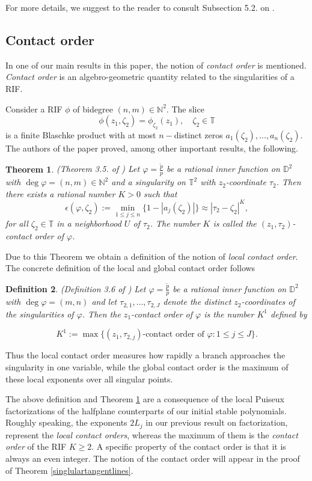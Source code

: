 \documentclass[12pt]{amsart}
\newtheorem{theorem}{Theorem}[section]
\newtheorem{definition}[theorem]{Definition}
\numberwithin{equation}{section}
\begin{document}
For more details, we suggest to the reader to consult Subsection 5.2. on \cite{Clark}.
\subsection{Contact order} In one of our main results in this paper, the notion of \textit{contact order} is mentioned. \textit{Contact order} is an algebro-geometric quantity related to the singularities of a RIF.

Consider a RIF $\phi$ of bidegree $(n,m)\in \mathbb{N}^2.$ The slice $$\phi(z_1,\zeta_2)=\phi_{\zeta_2}(z_1),\quad \zeta_2\in\mathbb{T}$$ is a finite Blaschke product with at most $n-$distinct zeros $a_1(\zeta_2),...,a_n(\zeta_2).$ The authors of the paper \cite{PLMS} proved, among other important results, the following.

\begin{theorem}(Theorem 3.5. of \cite{PLMS}) 
\label{def:loccont}
Let
$\varphi=\frac{\tilde p}{p}$ 
be a rational inner function on $\mathbb{D}^2$ with $\deg \varphi=(n,m)\in\mathbb{N}^2$ and a
singularity on $\mathbb{T}^2$ with $z_2$-coordinate $\tau_2$. Then there exists a
rational number $K>0$ such that
$$\epsilon(\varphi,\zeta_2):=\min_{1\leq j\leq n}\{1-|a_j(\zeta_2)|\}\approx |\tau_2-\zeta_2|^K,$$
for all $\zeta_2\in\mathbb{T}$ in a neighborhood $U$ of $\tau_2$. The number $K$ is
called the $(z_1,\tau_2)$-contact order of $\varphi$.
\end{theorem}
Due to this Theorem we obtain a definition of the notion of \textit{local contact order}.
The concrete definition of the local and global contact order follows

\begin{definition}(Definition 3.6 of \cite{PLMS}) Let $\varphi=\frac{\tilde p}{p}$ be a rational inner function on $\mathbb{D}^2$ with $\deg \varphi=(m,n)$ and let
$\tau_{2,1},\ldots,\tau_{2,J}$ denote the distinct $z_2$-coordinates of the singularities of
$\varphi$. Then the $z_1$-contact order of $\varphi$ is the number $K^1$ defined by

$$K^1:=\max\bigl\{(z_1,\tau_{2,j})\text{-contact order of }\varphi : 1\le j\le J\bigr\}.$$
\end{definition}

Thus the local contact order measures how rapidly a branch approaches the singularity in one variable, while the global contact order is the maximum of these local exponents over all singular points.

The above definition and Theorem \ref{def:loccont} are a consequence of the local Puiseux factorizations of the halfplane counterparts of our initial stable polynomials. Roughly speaking, the exponents $2L_j$ in our previous result on factorization, represent the \textit{local contact orders}, whereas the maximum of them is the \textit{contact order} of the RIF $K\ge2$. A specific property of the contact order is that it is always an even integer. The notion of the contact order will appear in the proof of Theorem \ref{singlulartangentlines}.
\end{document}
